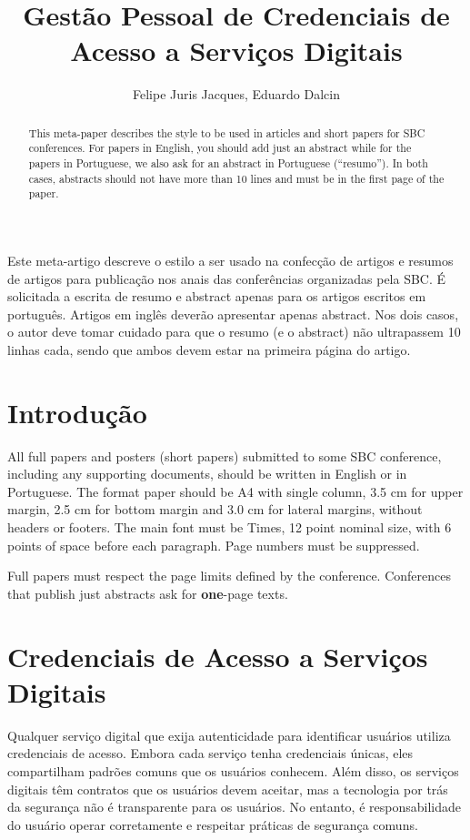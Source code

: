 \documentclass[12pt]{article}
\title{Gestão Pessoal de Credenciais de Acesso a Serviços Digitais}
\author{Felipe Juris Jacques\inst{1}, Eduardo Dalcin\inst{1} }
\begin{document}
 

\maketitle

\begin{abstract}
  This meta-paper describes the style to be used in articles and short papers
  for SBC conferences. For papers in English, you should add just an abstract
  while for the papers in Portuguese, we also ask for an abstract in
  Portuguese (``resumo''). In both cases, abstracts should not have more than
  10 lines and must be in the first page of the paper.
\end{abstract}
     
\begin{resumo} 
  Este meta-artigo descreve o estilo a ser usado na confecção de artigos e
  resumos de artigos para publicação nos anais das conferências organizadas
  pela SBC. É solicitada a escrita de resumo e abstract apenas para os artigos
  escritos em português. Artigos em inglês deverão apresentar apenas abstract.
  Nos dois casos, o autor deve tomar cuidado para que o resumo (e o abstract)
  não ultrapassem 10 linhas cada, sendo que ambos devem estar na primeira
  página do artigo.
\end{resumo}


\section{Introdução}

All full papers and posters (short papers) submitted to some SBC conference,
including any supporting documents, should be written in English or in
Portuguese. The format paper should be A4 with single column, 3.5 cm for upper
margin, 2.5 cm for bottom margin and 3.0 cm for lateral margins, without
headers or footers. The main font must be Times, 12 point nominal size, with 6
points of space before each paragraph. Page numbers must be suppressed.

Full papers must respect the page limits defined by the conference.
Conferences that publish just abstracts ask for \textbf{one}-page texts.

\section{Credenciais de Acesso a Serviços Digitais} \label{sec:firstpage}

Qualquer serviço digital que exija autenticidade para identificar usuários
utiliza credenciais de acesso.
Embora cada serviço tenha credenciais únicas, eles compartilham padrões
comuns que os usuários conhecem.
Além disso, os serviços digitais têm contratos que os usuários devem aceitar,
mas a tecnologia por trás da segurança não é transparente para os usuários.
No entanto, é responsabilidade do usuário operar corretamente e respeitar
práticas de segurança comuns.
\end{document}
